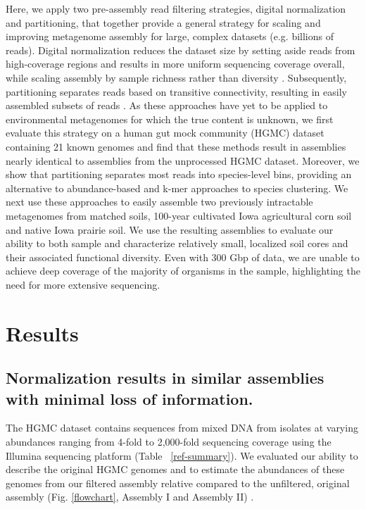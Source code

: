 \documentclass{pnastwo}
\begin{document}
\begin{article}
Here, we apply two pre-assembly read filtering strategies, digital
normalization and partitioning, that together provide a general strategy for scaling and
improving metagenome assembly for large, complex datasets (e.g. billions of reads). 
Digital normalization reduces the dataset size by setting aside reads from high-coverage
regions and results in more uniform sequencing coverage overall, while scaling assembly by sample richness rather than diversity \cite{browndiginorm}. Subsequently, partitioning separates reads based
on transitive connectivity, resulting in easily assembled subsets of reads \cite{Pell:2012cq}.
As these approaches have yet to be applied to environmental metagenomes for which the true content is unknown,
we first evaluate this strategy on a human gut mock community (HGMC) dataset containing 21 known genomes and find that these
methods result in assemblies nearly identical to assemblies from the unprocessed HGMC
dataset.  Moreover, we show that partitioning separates most reads into
species-level bins, providing an alternative to abundance-based and k-mer
approaches to species clustering.  We next use these approaches to easily assemble two previously intractable
metagenomes from matched soils, 100-year cultivated Iowa agricultural corn soil
and native Iowa prairie soil.  We use the resulting assemblies to evaluate our ability to both sample and characterize relatively small, localized soil cores and their associated functional diversity.  Even with 300 Gbp of data, we are unable to achieve deep coverage of the majority of organisms in the sample, highlighting the need for more extensive sequencing.

\section*{Results} \subsection*{Normalization results in similar assemblies with minimal loss of information.} 
The HGMC dataset contains sequences from mixed DNA from isolates at varying abundances ranging from 4-fold to
2,000-fold sequencing coverage using the Illumina sequencing platform (Table ~\ref{ref-summary}). We evaluated our ability to describe the original HGMC genomes and to estimate the abundances of these genomes from our filtered assembly relative compared to the unfiltered, original assembly (Fig. \ref{flowchart}, Assembly I and Assembly II) .  


\end{article}
\end{document}
